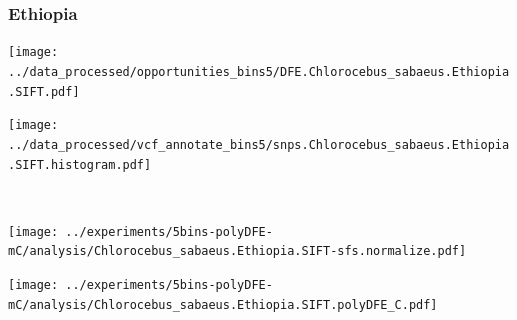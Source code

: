\subsubsection{Ethiopia}

\begin{minipage}{0.49\linewidth}
    \texttt{[image: ../data\_processed/opportunities\_bins5/DFE.Chlorocebus\_sabaeus.Ethiopia.SIFT.pdf]}
\end{minipage}
\begin{minipage}{0.49\linewidth}
    \texttt{[image: ../data\_processed/vcf\_annotate\_bins5/snps.Chlorocebus\_sabaeus.Ethiopia.SIFT.histogram.pdf]}
\end{minipage}
\\
\begin{minipage}{0.49\linewidth}
    \texttt{[image: ../experiments/5bins-polyDFE-mC/analysis/Chlorocebus\_sabaeus.Ethiopia.SIFT-sfs.normalize.pdf]}
\end{minipage}
\begin{minipage}{0.4\linewidth}
    \texttt{[image: ../experiments/5bins-polyDFE-mC/analysis/Chlorocebus\_sabaeus.Ethiopia.SIFT.polyDFE\_C.pdf]}
\end{minipage}
